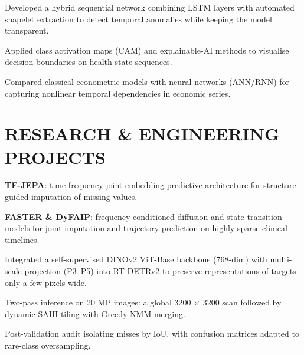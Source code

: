 \begin{cvitems}
  \item Developed a hybrid sequential network combining LSTM layers with automated shapelet extraction to detect temporal anomalies while keeping the model transparent.
  \item Applied class activation maps (CAM) and explainable-AI methods to visualise decision boundaries on health-state sequences.
\end{cvitems}

\begin{cvitems}
  \item Compared classical econometric models with neural networks (ANN/RNN) for capturing nonlinear temporal dependencies in economic series.
\end{cvitems}

\section{RESEARCH \& ENGINEERING PROJECTS}
\begin{cvitems}
  \item \textbf{TF-JEPA}: time-frequency joint-embedding predictive architecture for structure-guided imputation of missing values.
  \item \textbf{FASTER \& DyFAIP}: frequency-conditioned diffusion and state-transition models for joint imputation and trajectory prediction on highly sparse clinical timelines.
\end{cvitems}

\begin{cvitems}
  \item Integrated a self-supervised DINOv2 ViT-Base backbone (768-dim) with multi-scale projection (P3–P5) into RT-DETRv2 to preserve representations of targets only a few pixels wide.
  \item Two-pass inference on 20 MP images: a global 3200 $\times$ 3200 scan followed by dynamic SAHI tiling with Greedy NMM merging.
  \item Post-validation audit isolating misses by IoU, with confusion matrices adapted to rare-class oversampling.
\end{cvitems}

